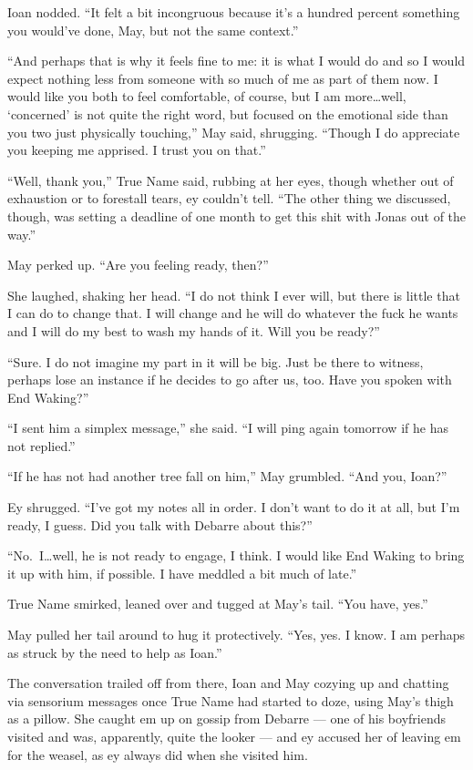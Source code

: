 Ioan nodded. ``It felt a bit incongruous because it's a hundred percent something you would've done, May, but not the same context.''

``And perhaps that is why it feels fine to me: it is what I would do and so I would expect nothing less from someone with so much of me as part of them now. I would like you both to feel comfortable, of course, but I am more\ldots well, `concerned' is not quite the right word, but focused on the emotional side than you two just physically touching,'' May said, shrugging. ``Though I do appreciate you keeping me apprised. I trust you on that.''

``Well, thank you,'' True Name said, rubbing at her eyes, though whether out of exhaustion or to forestall tears, ey couldn't tell. ``The other thing we discussed, though, was setting a deadline of one month to get this shit with Jonas out of the way.''

May perked up. ``Are you feeling ready, then?''

She laughed, shaking her head. ``I do not think I ever will, but there is little that I can do to change that. I will change and he will do whatever the fuck he wants and I will do my best to wash my hands of it. Will you be ready?''

``Sure. I do not imagine my part in it will be big. Just be there to witness, perhaps lose an instance if he decides to go after us, too. Have you spoken with End Waking?''

``I sent him a simplex message,'' she said. ``I will ping again tomorrow if he has not replied.''

``If he has not had another tree fall on him,'' May grumbled. ``And you, Ioan?''

Ey shrugged. ``I've got my notes all in order. I don't want to do it at all, but I'm ready, I guess. Did you talk with Debarre about this?''

``No.~I\ldots well, he is not ready to engage, I think. I would like End Waking to bring it up with him, if possible. I have meddled a bit much of late.''

True Name smirked, leaned over and tugged at May's tail. ``You have, yes.''

May pulled her tail around to hug it protectively. ``Yes, yes. I know. I am perhaps as struck by the need to help as Ioan.''

The conversation trailed off from there, Ioan and May cozying up and chatting via sensorium messages once True Name had started to doze, using May's thigh as a pillow. She caught em up on gossip from Debarre — one of his boyfriends visited and was, apparently, quite the looker — and ey accused her of leaving em for the weasel, as ey always did when she visited him.


